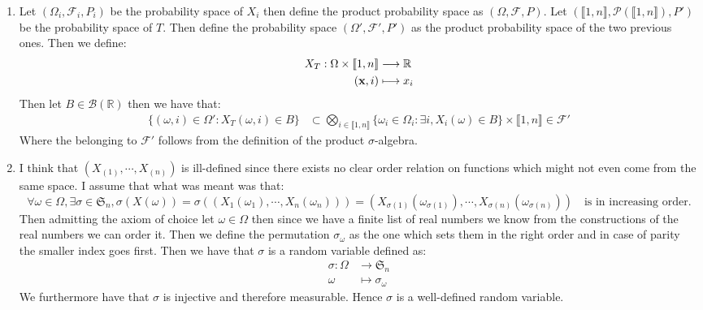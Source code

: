 \documentclass[10pt,a4paper]{article}
\begin{document}
\begin{enumerate}

\item Let $(\Omega_i, \mathcal{F}_i, P_i)$ be the probability space of $X_i$ then define the product probability space as $(\Omega, \mathcal{F}, P)$. Let $(\llbracket 1, n \rrbracket, \mathcal{P}(\llbracket 1, n \rrbracket), P')$ be the probability space of $T$. Then define the probability space $(\Omega', \mathcal{F}', P')$ as the product probability space of the two previous ones. Then we define:
\begin{align*}
X_T : \Omega \times \llbracket 1, n \rrbracket &\longrightarrow \mathbb{R}\\
(\vb{x}, i) &\longmapsto x_i
\end{align*}
Then let $B \in \mathcal{B}(\mathbb{R})$ then we have that:
\begin{align*}
\{(\omega, i) \in \Omega' : X_T(\omega, i) \in B\} &\subset \bigotimes_{i \in \llbracket 1, n \rrbracket} \{\omega_i \in \Omega_i : \exists i,  X_i(\omega) \in B\} \times \llbracket 1, n \rrbracket \in \mathcal{F}'
\end{align*}
Where the belonging to $\mathcal{F}'$ follows from the definition of the product $\sigma$-algebra. 

\item I think that $(X_{(1)}, \cdots, X_{(n)})$ is ill-defined since there exists no clear order relation on functions which might not even come from the same space. I assume that what was meant was that:
\[
\forall \omega \in \Omega, \exists \sigma \in \mathfrak{S}_n, \sigma(X(\omega)) = \sigma\left(\left(X_1(\omega_1), \cdots, X_n(\omega_n)\right)\right) = (X_{\sigma(1)}(\omega_{\sigma(1)}), \cdots, X_{\sigma(n)}(\omega_{\sigma(n)})) \mbox{~~ is in increasing order.} 
\]
Then admitting the axiom of choice let $\omega \in \Omega$ then since we have a finite list of real numbers we know from the constructions of the real numbers we can order it. Then we define the permutation $\sigma_\omega$ as the one which sets them in the right order and in case of parity the smaller index goes first. Then we have that $\sigma$ is a random variable defined as:
\begin{align*}
\sigma : \Omega &\longrightarrow \mathfrak{S}_n\\
\omega &\longmapsto \sigma_\omega
\end{align*}
We furthermore have that $\sigma$ is injective and therefore measurable. Hence $\sigma$ is a well-defined random variable.


\end{enumerate}
\end{document}
